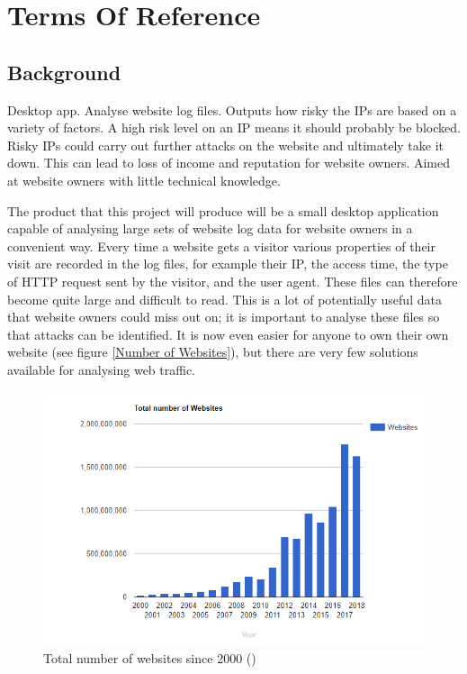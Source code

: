 \section{Terms Of Reference}
\subsection*{Background}
Desktop app. Analyse website log files. Outputs how risky the IPs are based on a variety of factors. A high risk level on an IP means it should probably be blocked. Risky IPs could carry out further attacks on the website and ultimately take it down. This can lead to loss of income and reputation for website owners. Aimed at website owners with little technical knowledge. 

The product that this project will produce will be a small desktop application capable of analysing large sets of website log data for website owners in a convenient way. Every time a website gets a visitor various properties of their visit are recorded in the log files, for example their IP, the access time, the type of HTTP request sent by the visitor, and the user agent. These files can therefore become quite large and difficult to read. This is a lot of potentially useful data that website owners could miss out on; it is important to analyse these files so that attacks can be identified. It is now even easier for anyone to own their own website (see figure \ref{Number of Websites}), but there are very few solutions available for analysing web traffic.

\begin{figure}[H] \label{Number of Websites} 
    \centering
    \includegraphics[width=\textwidth]{numberOfWebsites.png}
    \caption{Total number of websites since 2000 (\cite{NumberofWebsites})}
    \label{Total number of websites since 2000}
\end{figure}

